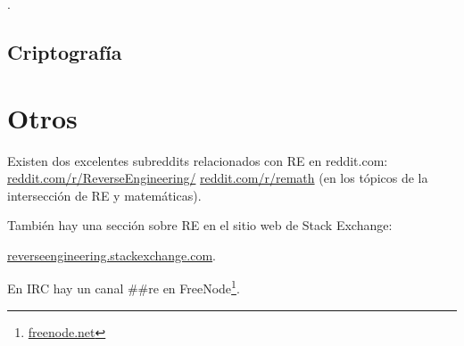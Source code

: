 \Javabook.

\section{Criptograf\'ia}



\chapter{Otros}

Existen dos excelentes subreddits relacionados con \ac{RE} en reddit.com:
\href{http://go.yurichev.com/17027}{reddit.com/r/ReverseEngineering/} \ESph{}
\href{http://go.yurichev.com/17028}{reddit.com/r/remath}
(en los t\'opicos de la intersecci\'on de \ac{RE} y matem\'aticas).

Tambi\'en hay una secci\'on sobre \ac{RE} en el sitio web de Stack Exchange:

\par
\href{http://go.yurichev.com/17029}{reverseengineering.stackexchange.com}.

En IRC hay un canal \#\#re en
FreeNode\footnote{\href{http://go.yurichev.com/17030}{freenode.net}}.

